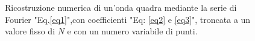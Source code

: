 \documentclass[10pt,a4paper]{article}
\begin{document}
\begin{figure}[H]
	\vspace{-0.3cm}
    
    
\caption{Ricostruzione numerica di un'onda quadra mediante la serie di Fourier "Eq.\ref{eq1}",con coefficienti "Eq: \ref{eq2} e \ref{eq3}", troncata a un valore fisso di \(N\) e con un numero variabile di punti.}  
\label{fig:imgP}  
\end{figure}  
\end{document}
